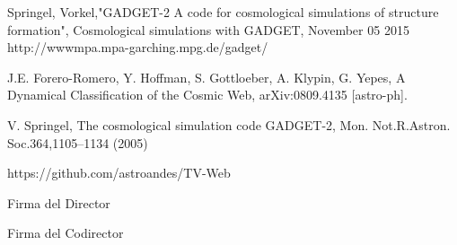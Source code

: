 \documentclass{article}
\begin{document}
\begin{thebibliography}{9}

Springel, Vorkel,"GADGET-2 A code for cosmological simulations of structure formation", Cosmological simulations with GADGET, November 05 2015
http://wwwmpa.mpa-garching.mpg.de/gadget/

J.E. Forero-Romero, Y. Hoffman, S. Gottloeber, A. Klypin, G. Yepes, A Dynamical Classification of the Cosmic Web, arXiv:0809.4135 [astro-ph].

V. Springel, The cosmological simulation code GADGET-2, Mon. Not.R.Astron. Soc.364,1105–1134 (2005)       

https://github.com/astroandes/TV-Web


\end{thebibliography}

Firma del Director


Firma del Codirector
\end{document}
